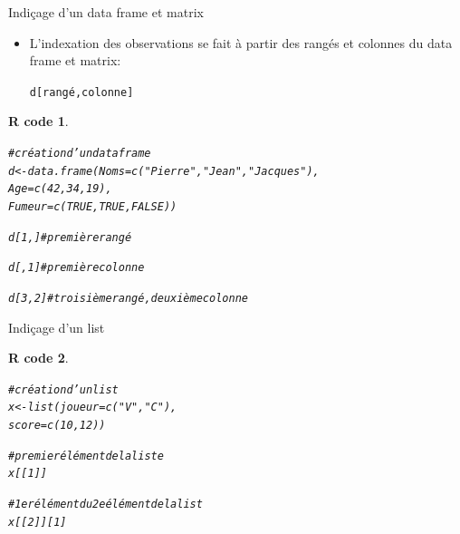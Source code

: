 \documentclass[11pt]{beamer}\usepackage[]{graphicx}\usepackage[]{color}
\makeatletter
\newcommand{\hlnum}[1]{\textcolor[rgb]{0.063,0.58,0.627}{#1}}%
\newcommand{\hlstr}[1]{\textcolor[rgb]{0.063,0.58,0.627}{#1}}%
\newcommand{\hlcom}[1]{\textcolor[rgb]{0.588,0.588,0.588}{#1}}%
\newcommand{\hlstd}[1]{\textcolor[rgb]{0.196,0.196,0.196}{#1}}%
\newcommand{\hlkwb}[1]{\textcolor[rgb]{0.627,0,0.314}{#1}}%
\newcommand{\hlkwc}[1]{\textcolor[rgb]{0,0.631,0.314}{#1}}%
\newcommand{\hlkwd}[1]{\textcolor[rgb]{0.78,0.227,0.412}{#1}}%
\newenvironment{kframe}{%
 \def\at@end@of@kframe{}%
 \ifinner\ifhmode%
  \def\at@end@of@kframe{\end{minipage}}%
  \begin{minipage}{\columnwidth}%
 \fi\fi%
 \def\FrameCommand##1{\hskip\@totalleftmargin \hskip-\fboxsep
 \colorbox{shadecolor}{##1}\hskip-\fboxsep
     \hskip-\linewidth \hskip-\@totalleftmargin \hskip\columnwidth}%
 \MakeFramed {\advance\hsize-\width
   \@totalleftmargin\z@ \linewidth\hsize
   \@setminipage}}%
 {\par\unskip\endMakeFramed%
 \at@end@of@kframe}
\newenvironment{knitrout}{}{} %
\newtheorem{rcode}{R code}[section]
\newcommand{\code}[1]{\texttt{#1}}
\makeatother
\begin{document}
\begin{frame}[fragile]{Indi\c{c}age d'un data frame et matrix}

\begin{itemize}
  \setlength\itemsep{2em}
\item L'indexation des observations se fait à partir des rangés et colonnes du data frame et matrix:
\begin{center}
\code{d[rangé,colonne]}
\end{center}

\end{itemize}

\begin{knitrout}
\color{fgcolor}\begin{kframe}
\begin{rcode}\label{unnamed-chunk-26}\begin{alltt}
\hlcom{# création d'un data frame}
\hlstd{d} \hlkwb{<-} \hlkwd{data.frame}\hlstd{(}\hlkwc{Noms} \hlstd{=} \hlkwd{c}\hlstd{(}\hlstr{"Pierre"}\hlstd{,} \hlstr{"Jean"}\hlstd{,} \hlstr{"Jacques"}\hlstd{),}
\hlkwc{Age} \hlstd{=} \hlkwd{c}\hlstd{(}\hlnum{42}\hlstd{,} \hlnum{34}\hlstd{,} \hlnum{19}\hlstd{),}
\hlkwc{Fumeur} \hlstd{=} \hlkwd{c}\hlstd{(}\hlnum{TRUE}\hlstd{,} \hlnum{TRUE}\hlstd{,} \hlnum{FALSE}\hlstd{))}

\hlstd{d[}\hlnum{1}\hlstd{, ]} \hlcom{# première rangé}

\hlstd{d[ ,}\hlnum{1}\hlstd{]} \hlcom{# première colonne }

\hlstd{d[}\hlnum{3}\hlstd{,}\hlnum{2}\hlstd{]} \hlcom{# troisième rangé, deuxième colonne}
\end{alltt}
\end{rcode}\end{kframe}
\end{knitrout}
\end{frame}




\begin{frame}[fragile]{Indi\c{c}age d'un list}

\begin{knitrout}
\color{fgcolor}\begin{kframe}
\begin{rcode}\label{unnamed-chunk-27}\begin{alltt}
\hlcom{# création d'un list}
\hlstd{x} \hlkwb{<-} \hlkwd{list}\hlstd{(}\hlkwc{joueur} \hlstd{=} \hlkwd{c}\hlstd{(}\hlstr{"V"}\hlstd{,} \hlstr{"C"}\hlstd{),}
                  \hlkwc{score} \hlstd{=} \hlkwd{c}\hlstd{(}\hlnum{10}\hlstd{,} \hlnum{12}\hlstd{))}

\hlcom{# premier élément de la liste}
\hlstd{x[[}\hlnum{1}\hlstd{]]}

\hlcom{# 1er élément du 2e élément de la list}
\hlstd{x[[}\hlnum{2}\hlstd{]][}\hlnum{1}\hlstd{]}
\end{alltt}
\end{rcode}\end{kframe}
\end{knitrout}
\end{frame}
\end{document}
